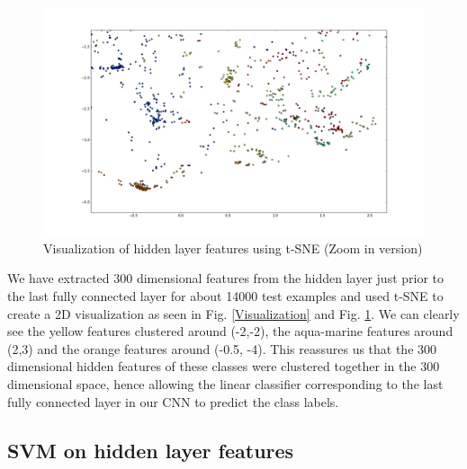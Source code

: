\documentclass[10pt,twocolumn,letterpaper]{article}
\begin{document}
\begin{figure}
\begin{center}
\includegraphics[width=\linewidth]{zoom2.png}
\end{center}
   \caption{Visualization of hidden layer features using t-SNE (Zoom in version)}
\label{Visualization2}
\end{figure}


We have extracted 300 dimensional features from the hidden layer just prior to the last fully connected layer for about 14000 test examples and used t-SNE \cite{van2008visualizing} to create a 2D visualization as seen in Fig. \ref{Visualization} and Fig. \ref{Visualization2}. We can clearly see the yellow features clustered around (-2,-2), the aqua-marine features around (2,3) and the orange features around (-0.5, -4). This reassures us that the 300 dimensional hidden features of these classes were clustered together in the 300 dimensional space, hence allowing the linear classifier corresponding to the last fully connected layer in our CNN to predict the class labels. 

\subsection{SVM on hidden layer features}
\end{document}
